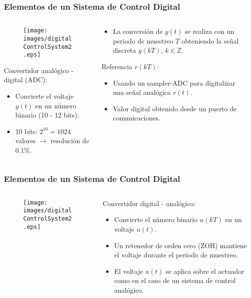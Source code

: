 \documentclass[aspectratio=169]{beamer}
\theoremstyle{definition}
\theoremstyle{plain}
\theoremstyle{remark}
\begin{document}
\begin{frame}[<+->]\frametitle{Elementos de un Sistema de Control Digital}
	\begin{columns}
		\begin{column}{0.5\textwidth}
			\begin{figure}
				\centering
				\texttt{[image: images/digitalControlSystem2.eps]}
			\end{figure}
			Convertidor analógico - digital (ADC):
			\begin{itemize}
				\item Convierte el voltaje $y(t)$ en un número binario (10 - 12 bits).
				\item 10 bits: $2^{10} = 1024$ valores $\rightarrow$ resolución de $0.1 \%$.
			\end{itemize}
		\end{column}
		\begin{column}{0.5\textwidth}
			\begin{itemize}
				\item La conversión de $y(t)$ se realiza con un periodo de muestreo $T$ obteniendo la señal discreta $y(kT)$, $k \in \mathbb{Z}$.
			\end{itemize}
			\pause
			Referencia $r(kT)$:
			\begin{itemize}
				\item Usando un sampler-ADC para digitalizar una señal analógica $r(t)$.
				\item Valor digital obtenido desde un puerto de comunicaciones.
			\end{itemize}
		\end{column}
	\end{columns}
\end{frame}

\begin{frame}[<+->]\frametitle{Elementos de un Sistema de Control Digital}
	\vspace*{-3mm}
	\begin{columns}
		\begin{column}{0.5\textwidth}
			\begin{figure}
				\centering
				\texttt{[image: images/digitalControlSystem2.eps]}
			\end{figure}
		\end{column}
		\begin{column}{0.5\textwidth}
			Convertidor digital - analógico:
			\begin{itemize}
				\item Convierte el número binario $u(kT)$ en un voltaje $u(t)$.
				\item Un retenedor de orden cero (ZOH) mantiene el voltaje durante el periodo de muestreo.
				\item El voltaje $u(t)$ se aplica sobre el actuador como en el caso de un sistema de control analógico.
			\end{itemize}
		\end{column}
	\end{columns}
\end{frame}
\end{document}
